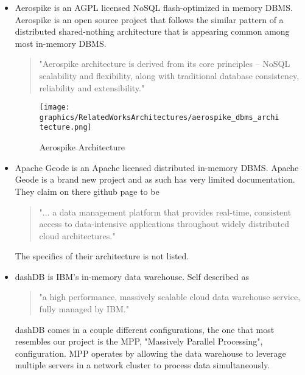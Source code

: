 \documentclass[letterpaper, 12pt]{article}
\renewcommand{\includegraphics}[2][]{\fbox{}}
\begin{document}
	\begin{itemize}
	  \par\vspace{\baselineskip}
	  \item Aerospike is an AGPL licensed NoSQL flash-optimized in memory 
	  DBMS. Aerospike is an open source project that follows the similar pattern of 
	  a distributed shared-nothing architecture that is appearing common among most
	  in-memory DBMS. 
	  \begin{quote}
	  "Aerospike architecture is derived from its core principles – NoSQL scalability and
	  flexibility, along with traditional database consistency, reliability and
	  extensibility."
	  \cite{aerospike}
	  \end{quote}
	  \par\vspace{\baselineskip}
	  \begin{figure}
	    \centering
	    \texttt{[image: graphics/RelatedWorksArchitectures/aerospike\_dbms\_architecture.png]}
	    \caption{Aerospike Architecture}
	  \end{figure}
	  \cite{aerospike}
	  \par\vspace{\baselineskip}	
	  \item Apache Geode is an Apache licensed distributed in-memory DBMS. Apache Geode is
	  a brand new project and as such has very limited documentation. They claim on there
	  github page to be 
	  \begin{quote}
	  "... a data management platform that provides real-time, consistent access to 
	  data-intensive applications throughout widely distributed cloud architectures."
	  \cite{aerospike}
	  \end{quote}
	  The specifics of their architecture is not listed. 
	  \par\vspace{\baselineskip}
	  \item dashDB is IBM's in-memory data warehouse. Self described as 
	  \begin{quote}
	  "a high performance, massively scalable cloud data warehouse service, 
	  fully managed by IBM." \cite{dashDB}
	  \end{quote}
	  dashDB comes in a couple different configurations, the one that most resembles 
	  our project is the MPP, "Massively Parallel Processing", configuration. 
	  MPP operates by allowing the data warehouse to leverage multiple servers 
	  in a network cluster to process data simultaneously. 

\end{itemize}
\end{document}
